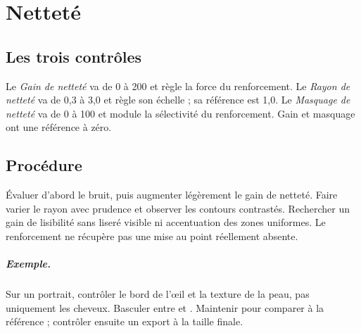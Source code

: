 \chapter{Netteté}
\section{Les trois contrôles}
Le \emph{Gain de netteté} va de 0 à 200 et règle la force du renforcement.
Le \emph{Rayon de netteté} va de 0,3 à 3,0 et règle son échelle ; sa référence
est 1,0. Le \emph{Masquage de netteté} va de 0 à 100 et module la sélectivité
du renforcement. Gain et masquage ont une référence à zéro.

\section{Procédure}
Évaluer d’abord le bruit, puis augmenter légèrement le gain de netteté.
Faire varier le rayon avec prudence et observer les contours contrastés.
Rechercher un gain de lisibilité sans liseré visible ni accentuation des
zones uniformes. Le renforcement ne récupère pas une mise au point réellement absente.

\paragraph{Exemple.}
Sur un portrait, contrôler le bord de l’œil et la texture de la peau, pas
uniquement les cheveux. Basculer entre  et .
Maintenir  pour comparer à la référence ; contrôler ensuite
un export à la taille finale.
\gestesreglages
